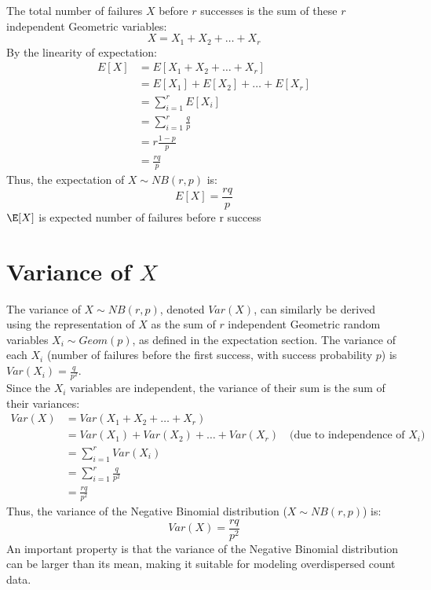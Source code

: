The total number of failures \(X\) before \(r\) successes is the sum of these
\(r\) independent Geometric variables:
\[ X = X_1 + X_2 + \dots + X_r \]
By the linearity of expectation:
\begin{align*}
  E[X] &= E[X_1 + X_2 + \dots + X_r] \\
       &= E[X_1] + E[X_2] + \dots + E[X_r] \\
       &= \sum_{i=1}^{r} E[X_i] \\
       &= \sum_{i=1}^{r} \frac{q}{p} \\
       &= r \frac{1-p}{p}\\
       &= \frac{rq}{p}
\end{align*}
Thus, the expectation of \(X \sim NB(r,p)\) is:
\begin{equation}
  \label{eq:nbd_expectation}
  E[X] = \frac{rq}{p}
\end{equation}
\(\E[X]\) is expected number of failures before r success

\section{Variance of \(X\)}
\label{sec:nbd_variance}
The variance of \(X \sim NB(r, p)\), denoted \(Var(X)\), can similarly be
derived using the representation of \(X\) as the sum of \(r\) independent
Geometric random variables \(X_i \sim Geom(p)\), as defined in the expectation
section. The variance of each \(X_i\) (number of failures before the first
success, with success probability \(p\)) is \(Var(X_i) = \frac{q}{p^2}\).
\\

Since the \(X_i\) variables are independent, the variance of their sum is the sum of their variances:
\begin{align*}
  Var(X) &= Var(X_1 + X_2 + \dots + X_r) \\
         &= Var(X_1) + Var(X_2) + \dots + Var(X_r) \quad \text{(due to independence of \(X_i\))} \\
         &= \sum_{i=1}^{r} Var(X_i) \\
         &= \sum_{i=1}^{r} \frac{q}{p^2} \\
         &= \frac{rq}{p^2}
\end{align*}
Thus, the variance of the Negative Binomial distribution (\(X \sim NB(r,p)\)) is:
\begin{equation}
  \label{eq:nbd_variance}
  Var(X) = \frac{rq}{p^2}
\end{equation}
An important property is that the variance of the Negative Binomial distribution
can be larger than its mean, making it suitable for modeling overdispersed count
data.

